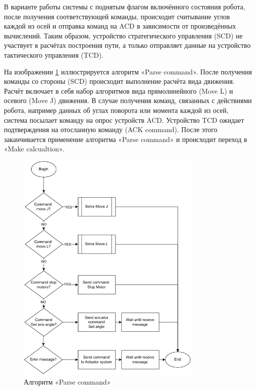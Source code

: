 В варианте работы системы с поднятым флагом включённого состояния робота, после получения соответствующей команды, происходит считывание углов каждой из осей и отправка команд на ACD в зависимости от произведённых вычислений. Таким образом, устройство стратегического управления (SCD) не участвует в расчётах построения пути, а только отправляет данные на устройство тактического управления (TCD).

На изображении \ref{AlgParse} иллюстрируется алгоритм «Parse command». После получения команды со стороны (SCD) происходит выполнение расчёта вида движения.  Расчёт включает в себя набор алгоритмов вида прямолинейного (Move L) и осевого (Move J) движения. В случае получения команд, связанных с действиями робота, например данных об углах поворота или момента каждой из осей, система посылает команду на опрос устройств ACD. Устройство TCD ожидает подтверждения на отосланную команду (ACK command). После этого заканчивается применение алгоритма «Parse command» и происходит переход в «Make calcualtion».

\begin{figure}[H]
	\centering
	\includegraphics[width=0.8\textwidth]{Src/images/parse.png}
	\caption{Алгоритм «Parse command»}
	\label{AlgParse}
\end{figure}


